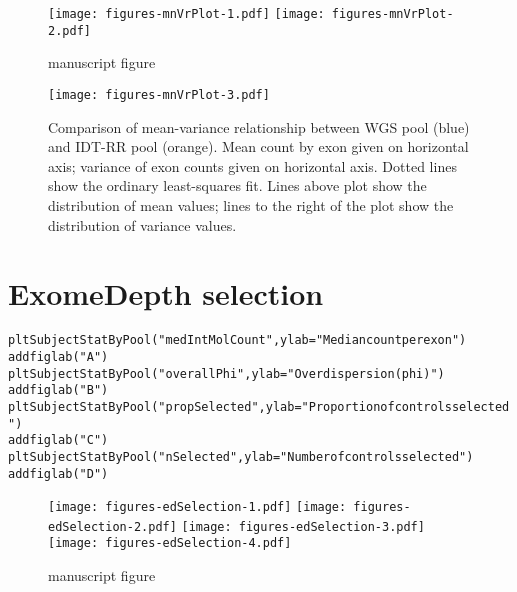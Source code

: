 \documentclass{article}\usepackage[]{graphicx}\usepackage[]{color}
\makeatletter
\newcommand{\hlstr}[1]{\textcolor[rgb]{0.063,0.58,0.627}{#1}}%
\newcommand{\hlstd}[1]{\textcolor[rgb]{0.196,0.196,0.196}{#1}}%
\newcommand{\hlkwc}[1]{\textcolor[rgb]{0,0.631,0.314}{#1}}%
\newcommand{\hlkwd}[1]{\textcolor[rgb]{0.78,0.227,0.412}{#1}}%
\newenvironment{kframe}{%
 \def\at@end@of@kframe{}%
 \ifinner\ifhmode%
  \def\at@end@of@kframe{\end{minipage}}%
  \begin{minipage}{\columnwidth}%
 \fi\fi%
 \def\FrameCommand##1{\hskip\@totalleftmargin \hskip-\fboxsep
 \colorbox{shadecolor}{##1}\hskip-\fboxsep
     \hskip-\linewidth \hskip-\@totalleftmargin \hskip\columnwidth}%
 \MakeFramed {\advance\hsize-\width
   \@totalleftmargin\z@ \linewidth\hsize
   \@setminipage}}%
 {\par\unskip\endMakeFramed%
 \at@end@of@kframe}
\newenvironment{knitrout}{}{} %
\makeatother
\begin{document}
\begin{figure}[H]
  \centering
  \texttt{[image: figures-mnVrPlot-1.pdf]}%
  \texttt{[image: figures-mnVrPlot-2.pdf]}
  \caption{manuscript figure}
\end{figure}

\begin{figure}[H]
  \centering
  \texttt{[image: figures-mnVrPlot-3.pdf]}%
  \caption{Comparison of mean-variance relationship between WGS pool (blue) and IDT-RR pool (orange). Mean count by exon given on horizontal axis; variance of exon counts given on horizontal axis. Dotted lines show the ordinary least-squares fit. Lines above plot show the distribution of mean values; lines to the right of the plot show the distribution of variance values.}
\end{figure}

\newpage
\section{ExomeDepth selection}

\begin{knitrout}
\color{fgcolor}\begin{kframe}
\begin{alltt}
\hlkwd{pltSubjectStatByPool}\hlstd{(}\hlstr{"medIntMolCount"}\hlstd{,} \hlkwc{ylab} \hlstd{=} \hlstr{"Median count per exon"}\hlstd{)}
\hlkwd{addfiglab}\hlstd{(}\hlstr{"A"}\hlstd{)}
\hlkwd{pltSubjectStatByPool}\hlstd{(}\hlstr{"overallPhi"}\hlstd{,} \hlkwc{ylab} \hlstd{=} \hlstr{"Overdispersion (phi)"}\hlstd{)}
\hlkwd{addfiglab}\hlstd{(}\hlstr{"B"}\hlstd{)}
\hlkwd{pltSubjectStatByPool}\hlstd{(}\hlstr{"propSelected"}\hlstd{,} \hlkwc{ylab} \hlstd{=} \hlstr{"Proportion of controls selected"}\hlstd{)}
\hlkwd{addfiglab}\hlstd{(}\hlstr{"C"}\hlstd{)}
\hlkwd{pltSubjectStatByPool}\hlstd{(}\hlstr{"nSelected"}\hlstd{,} \hlkwc{ylab} \hlstd{=} \hlstr{"Number of controls selected"}\hlstd{)}
\hlkwd{addfiglab}\hlstd{(}\hlstr{"D"}\hlstd{)}
\end{alltt}
\end{kframe}
\end{knitrout}

\begin{figure}[H]
  \centering
  \texttt{[image: figures-edSelection-1.pdf]}%
  \texttt{[image: figures-edSelection-2.pdf]}
  \texttt{[image: figures-edSelection-3.pdf]}%
  \texttt{[image: figures-edSelection-4.pdf]}
  \caption{manuscript figure}
\end{figure}
\end{document}
